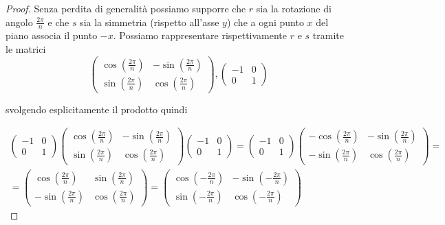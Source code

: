 \documentclass[11pt]{scrartcl}
\begin{document}
\begin{proof}
    Senza perdita di generalità possiamo supporre che $r$ sia la rotazione 
    di angolo $\displaystyle\frac{2\pi}{n}$ e che $s$ sia la simmetria
    (rispetto all'asse $y$) che 
    a ogni punto $x$ del piano associa il punto $-x$. Possiamo rappresentare
    rispettivamente $r$ e $s$ tramite le matrici
    \begingroup
    \renewcommand{\arraystretch}{1.2}
    \[
        \begin{pmatrix}
            \cos\left(\frac{2\pi}{n}\right) & -\sin\left(\frac{2\pi}{n}\right)\\
            \sin\left(\frac{2\pi}{n}\right) & \cos\left(\frac{2\pi}{n}\right)
        \end{pmatrix},
        \begin{pmatrix}
            -1 & 0\\
            0 & 1
        \end{pmatrix}
    \]
    \endgroup

    svolgendo esplicitamente il prodotto quindi
    
    \begingroup
    \renewcommand{\arraystretch}{1.2}
    \begin{multline*}
        \begin{pmatrix}
            -1 & 0\\
            0 & 1
        \end{pmatrix}
        \begin{pmatrix}
            \cos\left(\frac{2\pi}{n}\right) & -\sin\left(\frac{2\pi}{n}\right)\\
            \sin\left(\frac{2\pi}{n}\right) & \cos\left(\frac{2\pi}{n}\right)
        \end{pmatrix}
        \begin{pmatrix}
            -1 & 0\\
            0 & 1
        \end{pmatrix} = 
        \begin{pmatrix}
            -1 & 0\\
            0 & 1
        \end{pmatrix}
        \begin{pmatrix}
            -\cos\left(\frac{2\pi}{n}\right) & -\sin\left(\frac{2\pi}{n}\right)\\
            -\sin\left(\frac{2\pi}{n}\right) & \cos\left(\frac{2\pi}{n}\right)
        \end{pmatrix} = \\ =
        \begin{pmatrix}
            \cos\left(\frac{2\pi}{n}\right) & \sin\left(\frac{2\pi}{n}\right)\\
            -\sin\left(\frac{2\pi}{n}\right) & \cos\left(\frac{2\pi}{n}\right)
        \end{pmatrix} = 
        \begin{pmatrix}
            \cos\left(-\frac{2\pi}{n}\right) & -\sin\left(-\frac{2\pi}{n}\right)\\
            \sin\left(-\frac{2\pi}{n}\right) & \cos\left(-\frac{2\pi}{n}\right)
        \end{pmatrix}
    \end{multline*}
    \endgroup
    

\end{proof}
\end{document}
